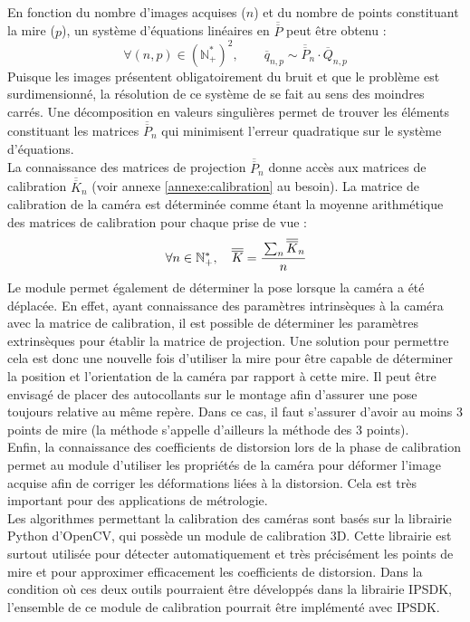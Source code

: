 \documentclass[a4paper, 11pt]{article}
\begin{document}
		\\En fonction du nombre d'images acquises ($n$) et du nombre de points constituant la mire ($p$), un système d'équations linéaires en $\overline{\overline{P}}$ peut être obtenu :
		\begin{equation}
			\forall (n, p) \in (\mathbb{N}_+^*)^2, \qquad \overline{q}_{n, p} \sim \overline{\overline{P}}_n \cdot \overline{Q}_{n, p}
		\end{equation}
		Puisque les images présentent obligatoirement du bruit et que le problème est surdimensionné, la résolution de ce système de se fait au sens des moindres carrés. Une décomposition en valeurs singulières permet de trouver les éléments constituant les matrices $\overline{\overline{P}}_n$ qui minimisent l'erreur quadratique sur le système d'équations.
		\\La connaissance des matrices de projection $\overline{\overline{P}}_n$ donne accès aux matrices de calibration $\overline{\overline{K}}_n$ (voir annexe \ref{annexe:calibration} au besoin). La matrice de calibration de la caméra est déterminée comme étant la moyenne arithmétique des matrices de calibration pour chaque prise de vue :
		\begin{equation}
			\forall n \in \mathbb{N}_+^*, \quad \overline{\overline{K}} = \cfrac{\sum_n \overline{\overline{K}}_n}{n}
		\end{equation}
		Le module permet également de déterminer la pose lorsque la caméra a été déplacée. En effet, ayant connaissance des paramètres intrinsèques à la caméra avec la matrice de calibration, il est possible de déterminer les paramètres extrinsèques pour établir la matrice de projection. Une solution pour permettre cela est donc une nouvelle fois d'utiliser la mire pour être capable de déterminer la position et l'orientation de la caméra par rapport à cette mire. Il peut être envisagé de placer des autocollants sur le montage afin d'assurer une pose toujours relative au même repère. Dans ce cas, il faut s'assurer d'avoir au moins \num{3} points de mire (la méthode s'appelle d'ailleurs la méthode des 3 points).
		\\Enfin, la connaissance des coefficients de distorsion lors de la phase de calibration permet au module d'utiliser les propriétés de la caméra pour déformer l'image acquise afin de corriger les déformations liées à la distorsion. Cela est très important pour des applications de métrologie.
		\\Les algorithmes permettant la calibration des caméras sont basés sur la librairie Python d'OpenCV, qui possède un module de calibration 3D. Cette librairie est surtout utilisée pour détecter automatiquement et très précisément les points de mire et pour approximer efficacement les coefficients de distorsion. Dans la condition où ces deux outils pourraient être développés dans la librairie IPSDK, l'ensemble de ce module de calibration pourrait être implémenté avec IPSDK.
	
\end{document}
